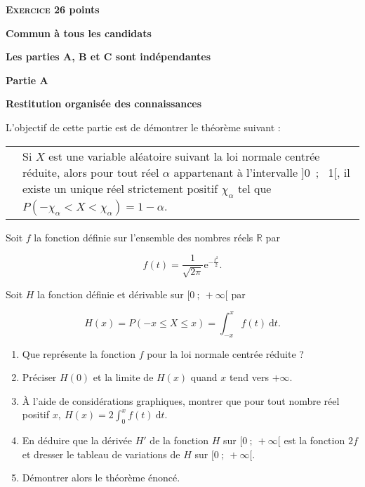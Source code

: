 \documentclass[10pt]{article}
\newcommand{\R}{\mathbb{R}}
\begin{document}
\vspace{0,5cm}

\textbf{\textsc{Exercice 2}\hfill 6 points}

\textbf{Commun à tous les candidats}

\medskip
 
\textbf{Les parties A, B et C sont indépendantes}

\medskip
 
\textbf{Partie A}

\medskip
 
\textbf{Restitution organisée des connaissances}
\medskip
 
L'objectif de cette partie est de démontrer le théorème suivant :
 
\begin{tabularx}{\linewidth}{m{1.5cm}|X}
&Si $X$ est une variable aléatoire suivant la loi normale centrée réduite, alors pour tout réel $\alpha$ appartenant à l'intervalle ]0~;~ 1[, il existe un unique réel strictement positif $\chi_{\alpha}$ tel que $P\left(- \chi_{\alpha} < X < \chi_{\alpha}\right) = 1 - \alpha$.
\end{tabularx} 

\medskip

Soit $f$  la fonction définie sur l'ensemble des nombres réels $\R$ par 

\[f(t) = \dfrac{1}{\sqrt{2\pi}}\text{e}^{- \frac{t^2}{2}}.\]
 
Soit $H$ la fonction définie et dérivable sur $[0~;~+ \infty[$ par 

\[H(x) = P(- x \leqslant X \leqslant x) = \displaystyle\int_{- x}^{x} f(t)\:\text{d}t.\]

\begin{enumerate}
\item Que représente la fonction $f$ pour la loi normale  centrée réduite ? 
\item Préciser $H(0)$ et la limite de $H(x)$ quand $x$ tend vers $+ \infty$. 
\item À l'aide de considérations graphiques, montrer que pour tout nombre réel positif $x,\: H(x) = 2\displaystyle\int_{0}^{x} f(t)\:\text{d}t$. 
\item En déduire que la dérivée $H'$ de la fonction $H$ sur $[0~;~+ \infty[$ est la fonction $2f$ et dresser le tableau de variations de $H$ sur $[0~;~+ \infty[$. 
\item Démontrer alors le théorème énoncé. 
\end{enumerate}
\end{document}
